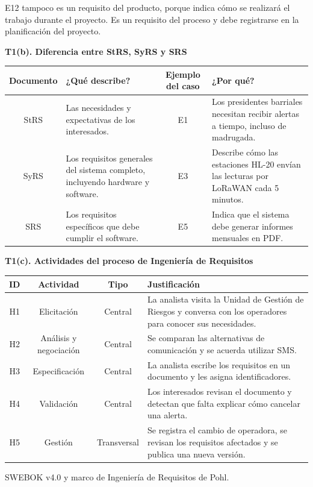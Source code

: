 \documentclass[11pt,a4paper]{article}
\begin{document}
E12 tampoco es un requisito del producto, porque indica cómo se realizará el trabajo durante el proyecto. Es un requisito del proceso y debe registrarse en la planificación del proyecto.

\textbf{T1(b). Diferencia entre StRS, SyRS y SRS}

\noindent\begin{tabularx}{\linewidth}{|c|Y|c|Y|}
\hline
\textbf{Documento} & \textbf{¿Qué describe?} & \textbf{Ejemplo del caso} & \textbf{¿Por qué?}\\
\hline
StRS & Las necesidades y expectativas de los interesados. & E1 & Los presidentes barriales necesitan recibir alertas a tiempo, incluso de madrugada.\\
\hline
SyRS & Los requisitos generales del sistema completo, incluyendo hardware y software. & E3 & Describe cómo las estaciones HL-20 envían las lecturas por LoRaWAN cada 5 minutos.\\
\hline
SRS & Los requisitos específicos que debe cumplir el software. & E5 & Indica que el sistema debe generar informes mensuales en PDF.\\
\hline
\end{tabularx}

\textbf{T1(c). Actividades del proceso de Ingeniería de Requisitos}

\noindent\begin{tabularx}{\linewidth}{|c|c|c|Y|}
\hline
\textbf{ID} & \textbf{Actividad} & \textbf{Tipo} & \textbf{Justificación}\\
\hline
H1 & Elicitación & Central & La analista visita la Unidad de Gestión de Riesgos y conversa con los operadores para conocer sus necesidades.\\
\hline
H2 & Análisis y negociación & Central & Se comparan las alternativas de comunicación y se acuerda utilizar SMS.\\
\hline
H3 & Especificación & Central & La analista escribe los requisitos en un documento y les asigna identificadores.\\
\hline
H4 & Validación & Central & Los interesados revisan el documento y detectan que falta explicar cómo cancelar una alerta.\\
\hline
H5 & Gestión & Transversal & Se registra el cambio de operadora, se revisan los requisitos afectados y se publica una nueva versión.\\
\hline
\end{tabularx}

SWEBOK v4.0 y marco de Ingeniería de Requisitos de Pohl.
\end{document}
